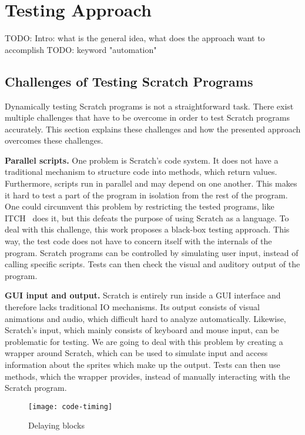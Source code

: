 
\chapter{Testing Approach}

TODO: Intro: what is the general idea, what does the approach want to accomplish
TODO: keyword "automation"

\section{Challenges of Testing Scratch Programs}

Dynamically testing Scratch programs is not a straightforward task.
There exist multiple challenges that have to be overcome in order to test Scratch programs accurately.
This section explains these challenges and how the presented approach overcomes these challenges.

\textbf{Parallel scripts.}
One problem is Scratch's code system.
It does not have a traditional mechanism to structure code into methods, which return values.
Furthermore, scripts run in parallel and may depend on one another.
This makes it hard to test a part of the program in isolation from the rest of the program.
One could circumvent this problem by restricting the tested programs, like ITCH~\cite{itch} does it,
but this defeats the purpose of using Scratch as a language.
To deal with this challenge, this work proposes a black-box testing approach.
This way, the test code does not have to concern itself with the internals of the program.
Scratch programs can be controlled by simulating user input, instead of calling specific scripts.
Tests can then check the visual and auditory output of the program.

\textbf{GUI input and output.}
Scratch is entirely run inside a GUI interface and therefore lacks traditional IO mechanisms.
Its output consists of visual animations and audio, which difficult hard to analyze automatically.
Likewise, Scratch's input, which mainly consists of keyboard and mouse input, can be problematic for testing.
We are going to deal with this problem by creating a wrapper around Scratch,
which can be used to simulate input and access information about the sprites which make up the output.
Tests can then use methods, which the wrapper provides, instead of manually interacting with the Scratch program.

\begin{wrapfigure}{r}{0.25\textwidth + 5mm}
    \centering
    \vspace{-6mm}
    \texttt{[image: code-timing]}
    \vspace{-3mm}
    \caption{Delaying blocks}
    \label{fig:delaying_blocks}
\end{wrapfigure}

